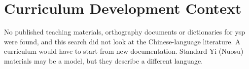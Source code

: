 \documentclass[12pt]{article}
\begin{document}
\section{Curriculum Development Context}
No published teaching materials, orthography documents or dictionaries for ysp were found, and this search did not look at the Chinese-language literature. A curriculum would have to start from new documentation. Standard Yi (Nuosu) materials may be a model, but they describe a different language.
\end{document}
